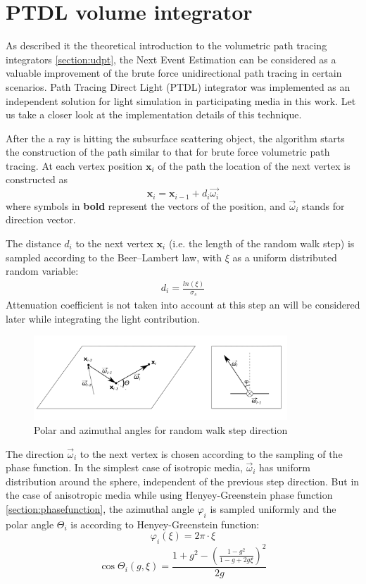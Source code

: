 \section{PTDL volume integrator}

As described it the theoretical introduction to the volumetric path tracing integrators
\ref{section:udpt}, the Next Event Estimation can be considered as a valuable improvement of the
brute force unidirectional path tracing in certain scenarios. Path Tracing Direct Light (\gls{PTDL})
integrator was implemented as an independent solution for light simulation in participating media in
this work. Let us take a closer look at the implementation details of this technique.

After the a ray is hitting the subsurface scattering object, the algorithm starts the construction
of the path similar to that for brute force volumetric path tracing. At each vertex position
$\mathbf{x}_i$ of the path the location of the next vertex is constructed as
\[
\mathbf{x}_{i}=\mathbf{x}_{i-1}+d_i\vec{\omega_i}
\]
where symbols in \textbf{bold} represent the vectors of the position, and $\vec{\omega}_i$ stands
for direction vector.

The distance $d_i$ to the next vertex $\mathbf{x}_{i}$ (i.e. the length of the random walk
step) is sampled according to the Beer--Lambert law, with $\xi$ as a uniform distributed random
variable:
\begin{align}
\label{eq:beers_lambert_sampling}
d_i = \frac{ln(\xi)}{\sigma_s}
\end{align}
Attenuation coefficient is not taken into account at this step an will be considered later while
integrating the light contribution.

\begin{figure}[h]
    \centering
    \includegraphics[width=0.85\textwidth]{imgs/schemes/omega}
    \caption{Polar and azimuthal angles for random walk step direction}
    \label{fig:omega}
\end{figure}

The direction $\vec{\omega}_i$ to the next vertex is chosen according to the sampling of the
phase function. In the simplest case of isotropic media, $\vec{\omega}_i$ has uniform distribution
around the sphere, independent of the previous step direction.
But in the case of anisotropic media while using Henyey-Greenstein phase function 
\ref{section:phasefunction}, the azimuthal angle $\varphi_i$ is sampled uniformly and the polar
angle $\Theta_i$ is according to Henyey-Greenstein function:
\[
\varphi_i(\xi)=2\pi\cdot\xi
\]
\begin{equation}
\label{eq:hg_sampling}
\cos{\Theta_i}(g, \xi) = \frac{1+g^2-(\frac{1-g^2}{1-g+2g\xi})^2}{2g} 
\end{equation}

